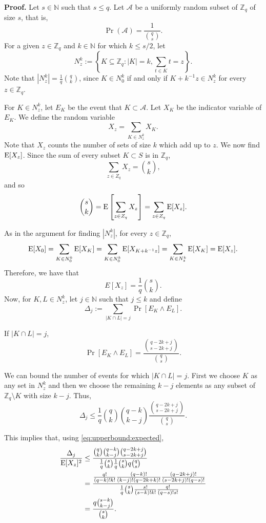 \textbf{Proof. } Let $s \in \mathbb{N}$ such that $s\leq q$. Let $\mathcal{A}$ be a uniformly random subset of $\mathbb{Z}_q$ of size $s$, that is, 
\[\Pr(\mathcal{A}) = \frac{1}{\binom{q}{s}}.\]
For a given $z \in \mathbb{Z}_q$ and $k \in \mathbb{N}$ for which $k \leq s/2$, let 
\[N_z^k := \left\{K \subseteq \mathbb{Z}_q: |K| = k, \sum_{t \in K} t = z\right\}.\]
Note that $|N_z^k| = \frac{1}{q}{\binom{q}{k}}$, since $K \in N_0^k$ if and only if $K + k^{-1}z \in N_z^k$ for every $z \in \mathbb{Z}_q$.\par
For $K \in N_z^k$, let $E_K$ be the event that $K \subset\mathcal{A}$. Let $X_K$ be the indicator variable of $E_K$.
We define the random variable 
\[X_z = \sum_{K \in N_z^k} X_K.\]
Note that $X_z$ counts the number of sets of size $k$ which add up to $z$. We now find $\mathrm{E}[X_z]$. Since the sum of every subset $K \subset S$ is in $\mathbb{Z}_q$,
\[\sum_{z \in Z_q} X_z = {\binom{s}{k}},\]
and so
\[\binom{s}{k} = \mathrm{E}\left[\sum_{z \in Z_q} X_z\right] =  \sum_{z \in Z_q} \mathrm{E}[X_z].\]\par
As in the argument for finding $|N_z^k|$, for every $z \in \mathbb{Z}_q$, 
\[\mathrm{E}[X_0] = \sum_{K \in N_0^k}\mathrm{E}[X_K] = \sum_{K \in N_0^k} \mathrm{E}[X_{K + k^{-1}z}] = \sum_{K \in N_z^k} \mathrm{E}[X_K] = \mathrm{E}[X_z].\]
Therefore, we have that
\begin{equation}\label{eq:upperbound:expected}
E[X_z] = \frac{1}{q} {\binom{s}{k}}.
\end{equation}
Now, for $K, L \in N_z^k$, let $j \in \mathbb{N}$ such that $j \leq k$ and define
\[\Delta_j := \sum_{|K \cap L| = j} \Pr[E_K \land E_L].\]
\par 
If $|K \cap L| = j$,
\[\Pr[E_K \land E_L] = \frac{\binom{q - 2k + j}{s - 2k + j}}{\binom{q}{s}}.\]
\par
We can bound the number of events for which $|K \cap L| = j$. First we choose $K$ as any set in $N_z^k$ and then we choose the remaining $k- j$ elements as any subset of $\mathbb{Z}_q \setminus K$ with size $k - j$. Thus, 
\[\Delta_j \leq \frac{1}{q}\binom{q}{k}\binom{q - k}{k - j} \frac{\binom{q - 2k + j}{s - 2k + j}}{\binom{q}{s}}.\]
\par This implies that, using \ref{eq:upperbound:expected},
\begin{align*}
    \frac{\Delta_j}{\mathrm{E}[X_z]^2} &\leq \frac{\binom{q}{k} \binom{q - k}{k - j}\binom{q - 2k + j}{s - 2k + j}}{\frac{1}{q} \binom{s}{k}\frac{1}{q} \binom{s}{k}q\binom{q}{s}} \\
    &= \frac{\frac{q!}{(q - k)!k!}\frac{(q - k)!}{(k - j)!(q - 2k + k)!}\frac{(q - 2k + j)!}{(s - 2k + j)!(q - s)!}}{\frac{1}{q}\binom{s}{k}\frac{s!}{(s - k)!k!}\frac{q!}{(q - s)!s!}} \\
    &= \frac{q\binom{s - k}{k - j}}{\binom{s}{k}}.
\end{align*}

